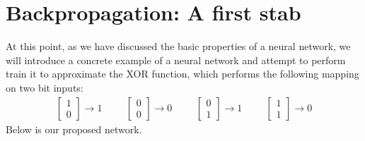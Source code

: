 \documentclass[12pt,letterpaper]{book}
\theoremstyle{definition}
\begin{document}
  \section{Backpropagation: A first stab}
  At this point, as we have discussed the basic properties of a neural network, 
  we will introduce a concrete example of a neural network and attempt to perform train it to 
  approximate the XOR function, which performs the following mapping on two bit inputs:
  \begin{align}
        \begin{bmatrix}
        1 \\ 0
      \end{bmatrix} \rightarrow 1 
      \hspace{1cm}
      \begin{bmatrix}
        0 \\ 0
      \end{bmatrix} \rightarrow 0
      \hspace{1cm}
      \begin{bmatrix}
        0 \\ 1
      \end{bmatrix} \rightarrow 1
      \hspace{1cm}
      \begin{bmatrix}
        1 \\ 1
      \end{bmatrix} \rightarrow 0
    \end{align}
  Below is our proposed network.
\end{document}
